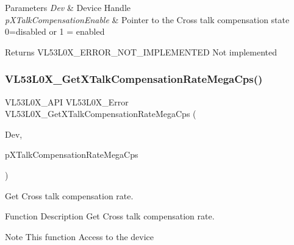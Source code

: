 \begin{DoxyParams}{Parameters}
{\em Dev} & Device Handle \\
\hline
{\em p\+X\+Talk\+Compensation\+Enable} & Pointer to the Cross talk compensation state 0=disabled or 1 = enabled \\
\hline
\end{DoxyParams}
\begin{DoxyReturn}{Returns}
V\+L53\+L0\+X\+\_\+\+E\+R\+R\+O\+R\+\_\+\+N\+O\+T\+\_\+\+I\+M\+P\+L\+E\+M\+E\+N\+T\+ED Not implemented 
\end{DoxyReturn}
\mbox{\label{group__VL53L0X__parameters__group_ga64f96b1cd03b06e46253d4ff3230bc18}} 
\subsubsection{\texorpdfstring{V\+L53\+L0\+X\+\_\+\+Get\+X\+Talk\+Compensation\+Rate\+Mega\+Cps()}{VL53L0X\_GetXTalkCompensationRateMegaCps()}}
{\footnotesize\ttfamily V\+L53\+L0\+X\+\_\+\+A\+PI V\+L53\+L0\+X\+\_\+\+Error V\+L53\+L0\+X\+\_\+\+Get\+X\+Talk\+Compensation\+Rate\+Mega\+Cps (\begin{DoxyParamCaption}\item[{\hyperlink{group__VL53L0X__platform__group_ga2d6405308b1dd524b462f1b8fb97d167}{V\+L53\+L0\+X\+\_\+\+D\+EV}}]{Dev,  }\item[{\hyperlink{vl53l0x__types_8h_afb910790161809fc76e1a274a6349384}{Fix\+Point1616\+\_\+t} $\ast$}]{p\+X\+Talk\+Compensation\+Rate\+Mega\+Cps }\end{DoxyParamCaption})}



Get Cross talk compensation rate. 

\begin{DoxyParagraph}{Function Description}
Get Cross talk compensation rate.
\end{DoxyParagraph}
\begin{DoxyNote}{Note}
This function Access to the device
\end{DoxyNote}

